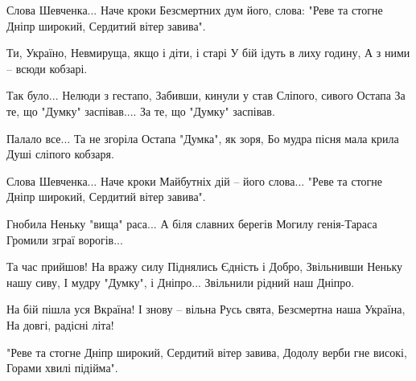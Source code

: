  
 
 
 
 


Слова Шевченка... Наче кроки
Безсмертних дум його, слова:
"Реве та стогне Дніпр широкий,
Сердитий вітер завива".

Ти, Україно,
Невмируща, якщо і діти, і старі
У бій ідуть в лиху годину,
А з ними – всюди кобзарі.

Так було... Нелюди з гестапо,
Забивши, кинули у став
Сліпого, сивого Остапа
За те, що "Думку" заспівав....
За те, що "Думку" заспівав.

Палало все... Та не згоріла
Остапа "Думка", як зоря,
Бо мудра пісня мала крила
Душі сліпого кобзаря.

Слова Шевченка... Наче кроки
Майбутніх дій – його слова...
"Реве та стогне Дніпр широкий,
Сердитий вітер завива".

Гнобила Неньку "вища" раса...
А біля славних берегів
Могилу генія-Тараса
Громили зграї ворогів...

Та час прийшов! На вражу силу
Піднялись Єдність і Добро,
Звільнивши Неньку нашу сиву,
І мудру "Думку", і Дніпро...
Звільнили рідний наш Дніпро.

На бій пішла уся Вкраїна!
І знову – вільна Русь свята,
Безсмертна наша Україна,
На довгі, радісні літа!

"Реве та стогне Дніпр широкий,
Сердитий вітер завива,
Додолу верби гне високі,
Горами хвилі підійма". 
